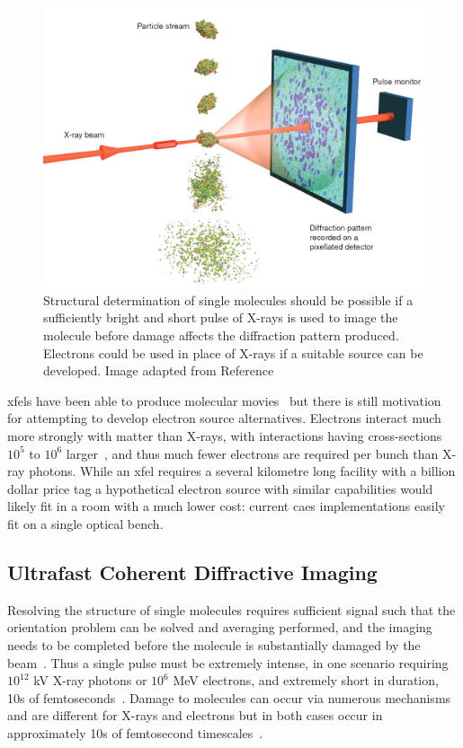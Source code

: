 \begin{figure}
    \center
    \includegraphics[width=0.65\linewidth]{0intro/Figs/single_molecule_cdi.jpg}
    \caption[Structural determination of single molecules.]{Structural determination of single molecules should be possible if a sufficiently bright and short pulse of X-rays is used to image the molecule before damage affects the diffraction pattern produced. Electrons could be used in place of X-rays if a suitable source can be developed. Image adapted from Reference~\cite{gaffney_imaging_2007}}
    \label{figure:molecule_cdi}
\end{figure}

\Glspl{xfel} have been able to produce molecular movies~\cite{kupitz_structural_2016,pande_femtosecond_2016,nango_three-dimensional_2016} but there is still motivation for attempting to develop electron source alternatives.
Electrons interact much more strongly with matter than X-rays, with interactions having cross-sections $10^5$ to $10^6$ larger~\cite{sciaini_femtosecond_2011}, and thus much fewer electrons are required per bunch than X-ray photons.
While an \gls{xfel} requires a several kilometre long facility with a billion dollar price tag a hypothetical electron source with similar capabilities would likely fit in a room with a much lower cost: current \gls{caes} implementations easily fit on a single optical bench.

\subsection{Ultrafast Coherent Diffractive Imaging}

Resolving the structure of single molecules requires sufficient signal such that the orientation problem can be solved and averaging performed, and the imaging needs to be completed before the molecule is substantially damaged by the beam~\cite{huldt_diffraction_2003}.
Thus a single pulse must be extremely intense, in one scenario requiring $10^{12}$ \unit[8]{kV} X-ray photons or $10^6$ \unit[3]{MeV} electrons, and extremely short in duration, 10s of femtoseconds~\cite{chapman_femtosecond_2006,spence_outrunning_2017}.
Damage to molecules can occur via numerous mechanisms and are different for X-rays and electrons but in both cases occur in approximately 10s of femtosecond timescales~\cite{spence_outrunning_2017}.

